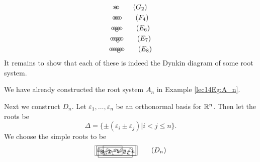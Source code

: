  \begin{gather*}
  \begin{xy}
    (0,0)="1" *\cir<2pt>{};
    (1,0)="2" *\cir<2pt>{} **@{-} ?*@{>},
    \ar@{-} "1" *{\hspace{3pt}};"2" *{\hspace{3pt}} <1.5pt>
    \ar@{-} "1" *{\hspace{3pt}};"2" *{\hspace{3pt}} <-1.5pt>
  \end{xy} \tag{$G_2$}\\
  \begin{xy}
    (0,0) *\cir<2pt>{};
    (1,0)  *\cir<2pt>{} **@{-};
    p+(1,0) *\cir<2pt>{} **@{=}; {?*@{>}},
    p+(1,0)  *\cir<2pt>{} **@{-};
  \end{xy} \tag{$F_4$}\\
  \begin{xy}
    (0,0) *\cir<2pt>{};
    (1,0)  *\cir<2pt>{} **@{-};
    p+(1,0) *\cir<2pt>{} **@{-};
    p+(0,-1) *\cir<2pt>{} **@{-},
    p+(1,0) *\cir<2pt>{} **@{-};
    p+(1,0) *\cir<2pt>{} **@{-};
  \end{xy} \tag{$E_6$}\\
  \begin{xy}
    (0,0) *\cir<2pt>{};
    (1,0)  *\cir<2pt>{} **@{-};
    p+(1,0) *\cir<2pt>{} **@{-};
    p+(1,0) *\cir<2pt>{} **@{-};
    p+(0,-1) *\cir<2pt>{} **@{-},
    p+(1,0) *\cir<2pt>{} **@{-};
    p+(1,0) *\cir<2pt>{} **@{-};
  \end{xy} \tag{$E_7$}\\
  \begin{xy}
    (0,0) *\cir<2pt>{};
    (1,0)  *\cir<2pt>{} **@{-};
    p+(1,0) *\cir<2pt>{} **@{-};
    p+(1,0) *\cir<2pt>{} **@{-};
    p+(1,0) *\cir<2pt>{} **@{-};
    p+(0,-1) *\cir<2pt>{} **@{-},
    p+(1,0) *\cir<2pt>{} **@{-};
    p+(1,0) *\cir<2pt>{} **@{-};
  \end{xy} \tag{$E_8$}\\
 \end{gather*}
 It remains to show that each of these is indeed the Dynkin diagram of some root
 system.

 We have already constructed the root system $A_n$ in Example \ref{lec14Eg:A_n}.

 Next we construct $D_n$. Let
 $\varepsilon_1,\dots, \varepsilon_n$ be an orthonormal basis for $\mathbb{R}^n$. Then let
 the roots be
 \[
    \Delta = \{\pm (\varepsilon_i \pm \varepsilon_j) | i< j\le n\}.
 \]
 We choose the simple roots to be
 \[\begin{xy}
   (0,0) *{\varepsilon_1 - \varepsilon_2} *+\frm{-}; (1,0) **@{-};
   (1.5,0) **{\hspace{.2mm}.\hspace{.2mm}};
   (3,0) *{\varepsilon_{n-2} - \varepsilon_{n-1}} *+\frm{-} **@{-};
   (3,-1) *{\varepsilon_{n-1} + \varepsilon_{n}} *+\frm{-} **@{-},
   (5.5,0) *{\varepsilon_{n-1} - \varepsilon_{n}} *+\frm{-} **@{-},
 \end{xy}\tag{$D_n$}\]

